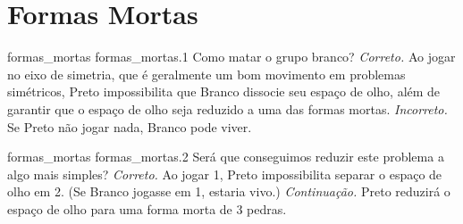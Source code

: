 \chapter{Formas Mortas}

\emptypage

\problemAnswerDiagram
  {formas_mortas}
  {formas_mortas.1}
  {Como matar o grupo branco?}
  {\emph{Correto.} Ao jogar no eixo de simetria, que é geralmente um bom movimento em problemas simétricos, Preto impossibilita que Branco dissocie seu espaço de olho, além de garantir que o espaço de olho seja reduzido a uma das formas mortas.}
  {\emph{Incorreto.} Se Preto não jogar nada, Branco pode viver.}

\problemAnswerDiagram
  {formas_mortas}
  {formas_mortas.2}
  {Será que conseguimos reduzir este problema a algo mais simples?}
  {\emph{Correto.} Ao jogar 1, Preto impossibilita separar o espaço de olho em 2. (Se Branco jogasse em 1, estaria vivo.)}
  {\emph{Continuação.} Preto reduzirá o espaço de olho para uma forma morta de 3 pedras.}